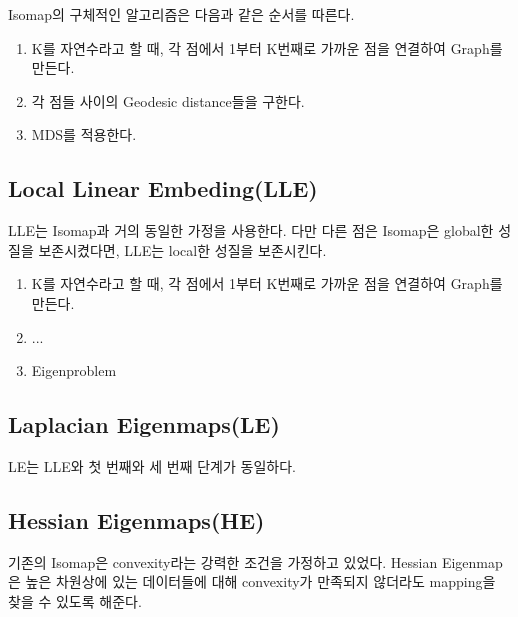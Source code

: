 \documentclass[a4paper]{article}
\begin{document}
    Isomap의 구체적인 알고리즘은 다음과 같은 순서를 따른다. 
    \begin{enumerate}
        \item K를 자연수라고 할 때, 각 점에서 1부터 K번째로 가까운 점을 연결하여 Graph를 만든다. 
        \item 각 점들 사이의 Geodesic distance들을 구한다. 
        \item MDS를 적용한다. 
    \end{enumerate}

    \subsection*{Local Linear Embeding(LLE)}
    LLE는 Isomap과 거의 동일한 가정을 사용한다. 
    다만 다른 점은 Isomap은 global한 성질을 보존시켰다면, LLE는 local한 성질을 보존시킨다. 
    \begin{enumerate}
        \item K를 자연수라고 할 때, 각 점에서 1부터 K번째로 가까운 점을 연결하여 Graph를 만든다. 
        \item ...
        \item Eigenproblem
    \end{enumerate}

    \subsection*{Laplacian Eigenmaps(LE)}
    LE는 LLE와 첫 번째와 세 번째 단계가 동일하다. 
    
    \subsection*{Hessian Eigenmaps(HE)}
    기존의 Isomap은 convexity라는 강력한 조건을 가정하고 있었다. 
    Hessian Eigenmap은 높은 차원상에 있는 데이터들에 대해 convexity가 만족되지 않더라도 mapping을 찾을 수 있도록 해준다. 
\end{document}
